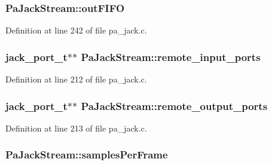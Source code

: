 \subsubsection[{\texorpdfstring{out\+F\+I\+FO}{outFIFO}}]{ Pa\+Jack\+Stream\+::out\+F\+I\+FO}\hypertarget{struct_pa_jack_stream_a8a863fb0eabe0f2d2e12ead03ae1857a}{}\label{struct_pa_jack_stream_a8a863fb0eabe0f2d2e12ead03ae1857a}


Definition at line 242 of file pa\+\_\+jack.\+c.

\subsubsection[{\texorpdfstring{remote\+\_\+input\+\_\+ports}{remote_input_ports}}]{\setlength{\rightskip}{0pt plus 5cm}jack\+\_\+port\+\_\+t$\ast$$\ast$ Pa\+Jack\+Stream\+::remote\+\_\+input\+\_\+ports}\hypertarget{struct_pa_jack_stream_a53279160d9418868badbc177dccba78e}{}\label{struct_pa_jack_stream_a53279160d9418868badbc177dccba78e}


Definition at line 212 of file pa\+\_\+jack.\+c.

\subsubsection[{\texorpdfstring{remote\+\_\+output\+\_\+ports}{remote_output_ports}}]{\setlength{\rightskip}{0pt plus 5cm}jack\+\_\+port\+\_\+t$\ast$$\ast$ Pa\+Jack\+Stream\+::remote\+\_\+output\+\_\+ports}\hypertarget{struct_pa_jack_stream_a4793965dd3b0f3b82b95532886587812}{}\label{struct_pa_jack_stream_a4793965dd3b0f3b82b95532886587812}


Definition at line 213 of file pa\+\_\+jack.\+c.

\subsubsection[{\texorpdfstring{samples\+Per\+Frame}{samplesPerFrame}}]{ Pa\+Jack\+Stream\+::samples\+Per\+Frame}\hypertarget{struct_pa_jack_stream_a4dd12058c95f9547625686ef80b296a2}{}\label{struct_pa_jack_stream_a4dd12058c95f9547625686ef80b296a2}



